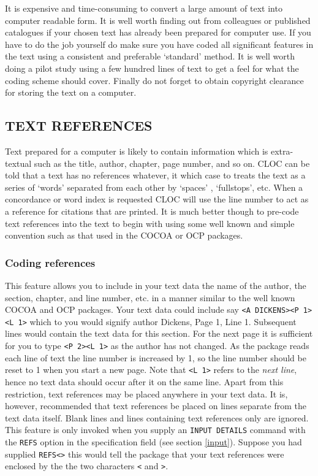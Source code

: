 It is expensive and time-consuming to convert a large amount of text
into computer readable form. It is well worth finding out from
colleagues or published catalogues if your chosen text has already
been prepared for computer use. If you have to do the job yourself
do make sure you have coded all significant features in the text
using a consistent and preferable `standard' method. It is well
worth doing a pilot study using a few hundred lines of text to
get a feel for what the coding scheme should cover. Finally do not
forget to obtain copyright clearance for storing the text on a computer.

\subsection{TEXT REFERENCES}
Text prepared for a computer is likely to contain information
which is extra-textual such as the title, author, chapter, page number,
and so on. CLOC can be told that a text has no references whatever,
it which case to treats the text as a series of `words' separated
from each other by `spaces' , `fullstops', etc. When a concordance
or word index is requested CLOC will use the line number to act as a
reference for citations that are printed. It is much better though to
pre-code text references into the text to begin with using some well
known and simple convention such as that used in the COCOA or OCP
packages.

\subsubsection{Coding references}
This feature allows you to include in your text data the name
of the author, the section, chapter, and line number, etc. in a
manner similar to the well known COCOA and OCP packages.
Your text data could include say \verb*/<A DICKENS><P 1><L 1>/ which to you
would signify author Dickens, Page 1, Line 1.  Subsequent lines
would contain the text data for this section.  For the next page
it is sufficient for you to type \verb*/<P 2><L 1>/ as the author has
not changed.  As the package reads each line of text the line
number is increased by 1, so the line number should be reset to 1
when you start a new page.  Note that \verb*/<L 1>/ refers to the
{\em next line},
hence no text data should occur after it on the same line.  Apart
from this restriction, text references may be placed anywhere in
your text data.  It is, however, recommended that text references
be placed on lines separate from the text data itself.  Blank
lines and lines containing text references only are ignored.
This feature is only invoked when you supply an \verb/INPUT DETAILS/ command
with the \verb/REFS/ option in the specification field
(see section \ref{input}).
Suppose you had supplied \verb/REFS<>/ this would tell the package that
your text
references were enclosed by the the two characters \verb/</ and \verb/>/.

